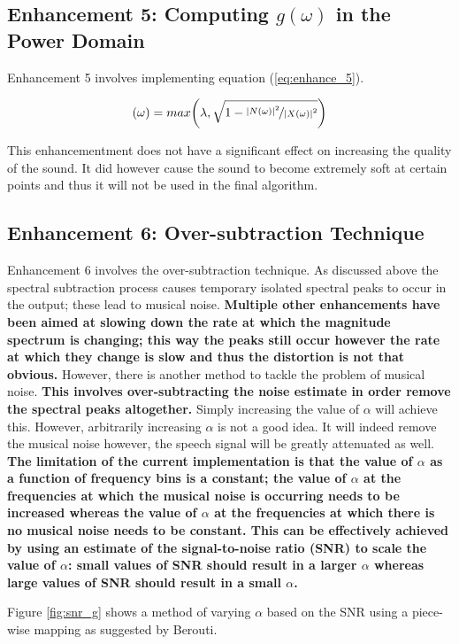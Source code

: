 \documentclass[a4paper,pra,twocolumn,10pt,aps,longbibliography,nobalancelastpage]{revtex4-1}
\begin{document}
\subsection{Enhancement 5: Computing $g(\omega)$ in the Power Domain}
Enhancement 5 involves implementing equation (\ref{eq:enhance_5}).

\begin{align}
    (\omega) = max\bigg(\lambda, \sqrt{1-\nicefrac{|N(\omega)|^{2}}{|X(\omega)|^{2}}}\bigg)\label{eq:enhance_5}
\end{align}

This enhancementment does not have a significant effect on increasing the quality of the sound. It did however cause the sound to become extremely soft at certain points and thus it will not be used in the final algorithm.

\subsection{Enhancement 6: Over-subtraction Technique}

Enhancement 6 involves the over-subtraction technique. As discussed above the spectral subtraction process causes temporary isolated spectral peaks to occur in the output; these lead to musical noise. \textbf{Multiple other enhancements have been aimed at slowing down the rate at which the magnitude spectrum is changing; this way the peaks still occur however the rate at which they change is slow and thus the distortion is not that obvious.} However, there is another method to tackle the problem of musical noise. \textbf{This involves over-subtracting the noise estimate in order remove the spectral peaks altogether.} Simply increasing the value of $\alpha$ will achieve this. However, arbitrarily increasing $\alpha$ is not a good idea. It will indeed remove the musical noise however, the speech signal will be greatly attenuated as well. \textbf{The limitation of the current implementation is that the value of $\alpha$ as a function of frequency bins is a constant; the value of $\alpha$ at the frequencies at which the musical noise is occurring needs to be increased whereas the value of $\alpha$ at the frequencies at which there is no musical noise needs to be constant. This can be effectively achieved by using an estimate of the signal-to-noise ratio (SNR) to scale the value of $\alpha$: small values of SNR should result in a larger $\alpha$ whereas large values of SNR should result in a small $\alpha$.}

Figure \ref{fig:snr_g} shows a method of varying $\alpha$ based on the SNR using a piece-wise mapping as suggested by Berouti. 
 
\end{document}

